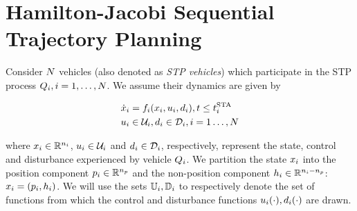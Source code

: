 \section{Hamilton-Jacobi Sequential Trajectory Planning \label{sec:formulation}}
Consider $N$ vehicles (also denoted as \textit{STP vehicles}) which participate in the STP process $Q_i, i = 1, \ldots, N$. We assume their dynamics are given by

\begin{equation}
\label{eq:dyn}
\begin{aligned}
\dot{x}_i &= f_i(x_i, u_i, d_i), t \le t^\text{STA}_i \\
u_i &\in \mathcal{U}_i, d_i \in \mathcal{D}_i, i = 1 \ldots, N
\end{aligned}
\end{equation}

\noindent where $x_i \in \mathbb{R}^{n_i}$, $u_i \in \mathcal{U}_i$ and $d_i \in \mathcal{D}_i$, respectively, represent the state, control and disturbance experienced by vehicle $Q_i$. We partition the state $x_i$ into the position component $p_i \in \mathbb{R}^{n_p}$ and the non-position component $h_i \in \mathbb{R}^{n_i - n_p}$: $x_i = (p_i, h_i)$. %
We will use the sets $\mathbb{U}_i, \mathbb{D}_i$ to respectively denote the set of functions from which the control and disturbance functions $u_i(\cdot), d_i(\cdot)$ are drawn.


